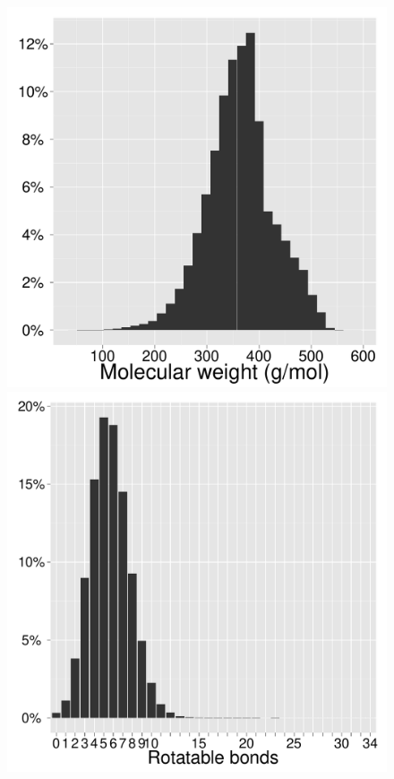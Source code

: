 \documentclass[12pt]{article}
\begin{document}
\begin{center}
\begin{figure}
\subfloat
{
  \includegraphics[width=0.485\linewidth]{MWT.pdf}
}
\subfloat
{
  \includegraphics[width=0.485\linewidth]{NRB.pdf}
}
\end{figure}
\end{center}

\clearpage
\end{document}
